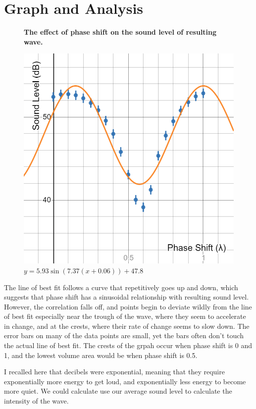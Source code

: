 \documentclass[index]{subfiles}
\begin{document}
\section{Graph and Analysis}

\begin{figure}[H]
    \centering
    \textbf{The effect of phase shift on the sound level of resulting wave.}\medskip\par
    \includegraphics[scale=0.3]{graph.png}
    \caption{\(y=5.93\sin\left(7.37\left(x+0.06\right)\right)+47.8\) }
\end{figure}

The line of best fit follows a curve that repetitively goes up and down, which suggests that phase shift has a sinusoidal relationship with resulting sound level. However, the correlation falls off, and points begin to deviate wildly from the line of best fit especially near the trough of the wave, where they seem to accelerate in change, and at the crests, where their rate of change seems to slow down. The error bars on many of the data points are small, yet the bars often don't touch the actual line of best fit. The crests of the grpah occur when phase shift is 0 and 1, and the lowest volume area would be when phase shift is 0.5.

I recalled here that decibels were exponential, meaning that they require exponentially more energy to get loud, and exponentially less energy to become more quiet. We could calculate use our average sound level to calculate the intensity of the wave.
\end{document}
